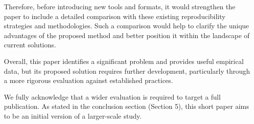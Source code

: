 \documentclass[%
	11pt,
	final,
]{article}
\begin{document}
Therefore, before introducing new tools and formats, it would strengthen the paper to include a detailed comparison with these existing reproducibility strategies and methodologies.
Such a comparison would help to clarify the unique advantages of the proposed method and better position it within the landscape of current solutions.

Overall, this paper identifies a significant problem and provides useful empirical data, but its proposed solution requires further development, particularly through a more rigorous evaluation against established practices.

\begin{review-answer}
  We fully acknowledge that a wider evaluation is required to target a full publication.
  As stated in the conclusion section (Section 5), this short paper aims to be an initial version of a larger-scale study.
\end{review-answer}
\end{document}
